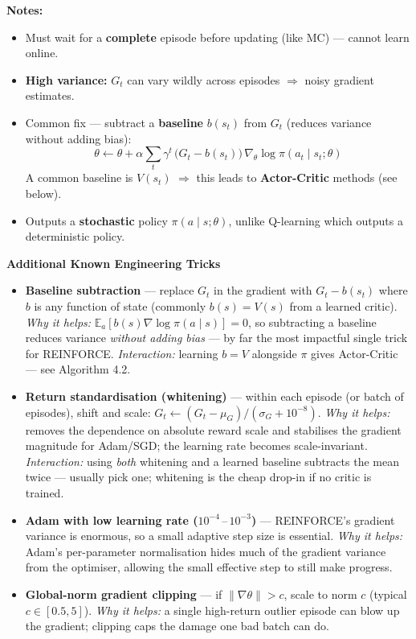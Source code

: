 \documentclass[11pt]{article}
\providecommand{\tightlist}{%
      \setlength{\itemsep}{0pt}\setlength{\parskip}{0pt}}
\begin{document}
\textbf{Notes:}

\begin{itemize}
\tightlist
\item
  Must wait for a \textbf{complete} episode before updating (like MC)
  --- cannot learn online.
\item
  \textbf{High variance:} \(G_t\) can vary wildly across episodes
  \(\Rightarrow\) noisy gradient estimates.
\item
  Common fix --- subtract a \textbf{baseline} \(b(s_t)\) from \(G_t\)
  (reduces variance without adding bias):
  \[\theta \leftarrow \theta + \alpha \sum_t \gamma^t\,\bigl(G_t - b(s_t)\bigr)\,\nabla_\theta \log \pi(a_t \mid s_t;\theta)\]
  A common baseline is \(V(s_t)\) \(\Rightarrow\) this leads to
  \textbf{Actor-Critic} methods (see below).
\item
  Outputs a \textbf{stochastic} policy \(\pi(a \mid s;\theta)\), unlike
  Q-learning which outputs a deterministic policy.
\end{itemize}

    \label{tricks-4-1}

    \textbf{Additional Known Engineering Tricks}

\begin{itemize}
\item
  \label{trick-4-1-1}\textbf{Baseline subtraction} ---
  replace \(G_t\) in the gradient with \(G_t - b(s_t)\) where \(b\) is
  any function of state (commonly \(b(s)=V(s)\) from a learned critic).
  \emph{Why it helps:} \(\mathbb{E}_a[b(s)\nabla\log\pi(a\mid s)] = 0\),
  so subtracting a baseline reduces variance \emph{without adding bias}
  --- by far the most impactful single trick for REINFORCE.
  \emph{Interaction:} learning \(b=V\) alongside \(\pi\) gives
  Actor-Critic --- see Algorithm 4.2.
\item
  \label{trick-4-1-2}\textbf{Return standardisation
  (whitening)} --- within each episode (or batch of episodes), shift and
  scale: \(G_t \leftarrow (G_t - \mu_G) / (\sigma_G + 10^{-8})\).
  \emph{Why it helps:} removes the dependence on absolute reward scale
  and stabilises the gradient magnitude for Adam/SGD; the learning rate
  becomes scale-invariant. \emph{Interaction:} using \emph{both}
  whitening and a learned baseline subtracts the mean twice --- usually
  pick one; whitening is the cheap drop-in if no critic is trained.
\item
  \label{trick-4-1-3}\textbf{Adam with low learning rate
  (\(10^{-4}\,\text{–}\,10^{-3}\))} --- REINFORCE's gradient variance is
  enormous, so a small adaptive step size is essential. \emph{Why it
  helps:} Adam's per-parameter normalisation hides much of the gradient
  variance from the optimiser, allowing the small effective step to
  still make progress.
\item
  \label{trick-4-1-4}\textbf{Global-norm gradient
  clipping} --- if \(\|\nabla\theta\| > c\), scale to norm \(c\)
  (typical \(c\in[0.5, 5]\)). \emph{Why it helps:} a single high-return
  outlier episode can blow up the gradient; clipping caps the damage one
  bad batch can do.
\end{itemize}
\end{document}
